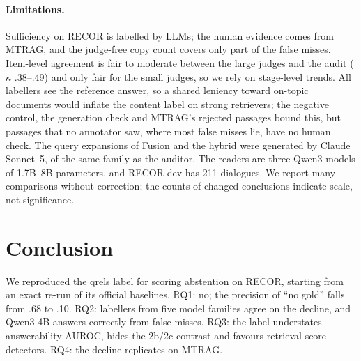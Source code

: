 \documentclass[11pt]{article}
\begin{document}
\paragraph{Limitations.}
Sufficiency on RECOR is labelled by LLMs; the human evidence comes from MTRAG, and the judge-free copy count covers only part of the false misses. Item-level agreement is fair to moderate between the large judges and the audit ($\kappa$ .38--.49) and only fair for the small judges, so we rely on stage-level trends. All labellers see the reference answer, so a shared leniency toward on-topic documents would inflate the content label on strong retrievers; the negative control, the generation check and MTRAG's rejected passages bound this, but passages that no annotator saw, where most false misses lie, have no human check. The query expansions of Fusion and the hybrid were generated by Claude Sonnet~5, of the same family as the auditor. The readers are three Qwen3 models of 1.7B--8B parameters, and RECOR dev has 211 dialogues. We report many comparisons without correction; the counts of changed conclusions indicate scale, not significance.

\section{Conclusion}

We reproduced the qrels label for scoring abstention on RECOR, starting from an exact re-run of its official baselines. RQ1: no; the precision of ``no gold'' falls from .68 to .10. RQ2: labellers from five model families agree on the decline, and Qwen3-4B answers correctly from false misses. RQ3: the label understates answerability AUROC, hides the 2b/2c contrast and favours retrieval-score detectors. RQ4: the decline replicates on MTRAG.


\end{document}

